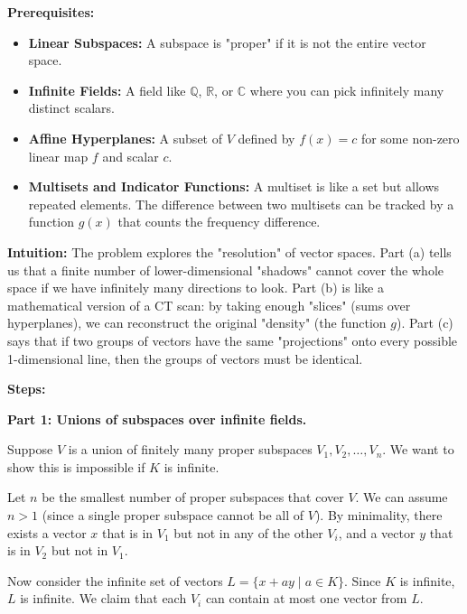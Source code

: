 \begin{solution}
\textbf{Prerequisites:}
\begin{itemize}
    \item \textbf{Linear Subspaces:} A subspace is "proper" if it is not the entire vector space.
    \item \textbf{Infinite Fields:} A field like $\mathbb{Q}$, $\mathbb{R}$, or $\mathbb{C}$ where you can pick infinitely many distinct scalars.
    \item \textbf{Affine Hyperplanes:} A subset of $V$ defined by $f(x) = c$ for some non-zero linear map $f$ and scalar $c$.
    \item \textbf{Multisets and Indicator Functions:} A multiset is like a set but allows repeated elements. The difference between two multisets can be tracked by a function $g(x)$ that counts the frequency difference.
\end{itemize}

\bigskip

\textbf{Intuition:}
The problem explores the "resolution" of vector spaces. Part (a) tells us that a finite number of lower-dimensional "shadows" cannot cover the whole space if we have infinitely many directions to look. Part (b) is like a mathematical version of a CT scan: by taking enough "slices" (sums over hyperplanes), we can reconstruct the original "density" (the function $g$). Part (c) says that if two groups of vectors have the same "projections" onto every possible 1-dimensional line, then the groups of vectors must be identical.

\bigskip

\textbf{Steps:}

\textbf{Part 1: Unions of subspaces over infinite fields.}

Suppose $V$ is a union of finitely many proper subspaces $V_1, V_2, \dots, V_n$. We want to show this is impossible if $K$ is infinite.

\bigskip

Let $n$ be the smallest number of proper subspaces that cover $V$. We can assume $n > 1$ (since a single proper subspace cannot be all of $V$). By minimality, there exists a vector $x$ that is in $V_1$ but not in any of the other $V_i$, and a vector $y$ that is in $V_2$ but not in $V_1$.

\bigskip

Now consider the infinite set of vectors $L = \{ x + ay \mid a \in K \}$. Since $K$ is infinite, $L$ is infinite. We claim that each $V_i$ can contain at most one vector from $L$.


\end{solution}
